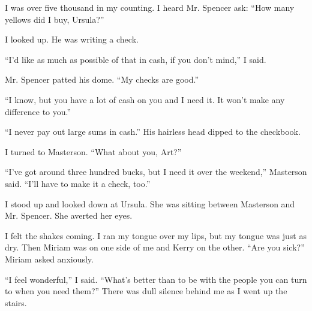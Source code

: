\documentclass{novel}
\begin{document}
{I was over five thousand in my counting. I heard Mr. Spencer ask: “How many yellows did I buy, Ursula?”

I looked up. He was writing a check.

“I’d like as much as possible of that in cash, if you don’t mind,” I said.

Mr. Spencer patted his dome. “My checks are good.”

“I know, but you have a lot of cash on you and I need it. It won’t make any difference to you.”

“I never pay out large sums in cash.” His hairless head dipped to the checkbook.

I turned to Masterson. “What about you, Art?”

“I’ve got around three hundred bucks, but I need it over the weekend,” Masterson said. “I’ll have to make it a check, too.”

I stood up and looked down at Ursula. She was sitting between Masterson and Mr. Spencer. She averted her eyes.

I felt the shakes coming. I ran my tongue over my lips, but my tongue was just as dry. Then Miriam was on one side of me and Kerry on the other. “Are you sick?” Miriam asked anxiously.

“I feel wonderful,” I said. “What’s better than to be with the people you can turn to when you need them?” There was dull silence behind me as I went up the stairs.

}

\vspace{2\nbs}
\clearpage
\thispagestyle{empty}
\end{document}

